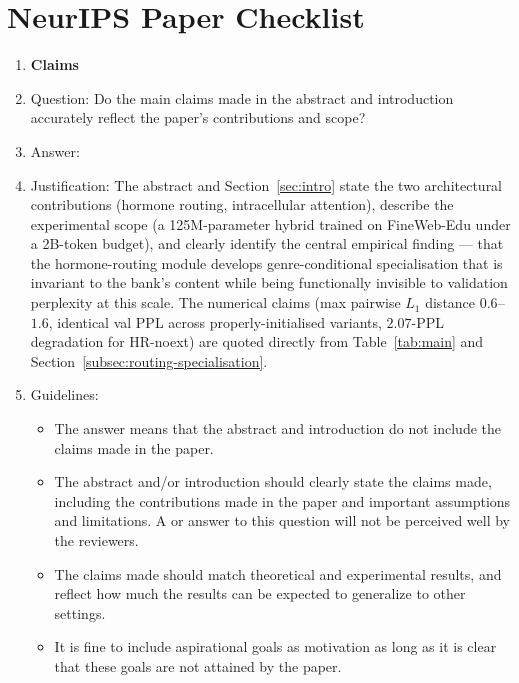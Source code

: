 \section*{NeurIPS Paper Checklist}


\begin{enumerate}

\item {\bf Claims}
    \item[] Question: Do the main claims made in the abstract and introduction accurately reflect the paper's contributions and scope?
    \item[] Answer: \answerYes{}
    \item[] Justification: The abstract and Section~\ref{sec:intro} state the two architectural contributions (hormone routing, intracellular attention), describe the experimental scope (a 125M-parameter hybrid trained on FineWeb-Edu under a 2B-token budget), and clearly identify the central empirical finding --- that the hormone-routing module develops genre-conditional specialisation that is invariant to the bank's content while being functionally invisible to validation perplexity at this scale. The numerical claims (max pairwise $L_1$ distance $0.6$--$1.6$, identical val PPL across properly-initialised variants, $2.07$-PPL degradation for HR-noext) are quoted directly from Table~\ref{tab:main} and Section~\ref{subsec:routing-specialisation}.
    \item[] Guidelines:
    \begin{itemize}
        \item The answer \answerNA{} means that the abstract and introduction do not include the claims made in the paper.
        \item The abstract and/or introduction should clearly state the claims made, including the contributions made in the paper and important assumptions and limitations. A \answerNo{} or \answerNA{} answer to this question will not be perceived well by the reviewers. 
        \item The claims made should match theoretical and experimental results, and reflect how much the results can be expected to generalize to other settings. 
        \item It is fine to include aspirational goals as motivation as long as it is clear that these goals are not attained by the paper. 
    \end{itemize}


\end{enumerate}
